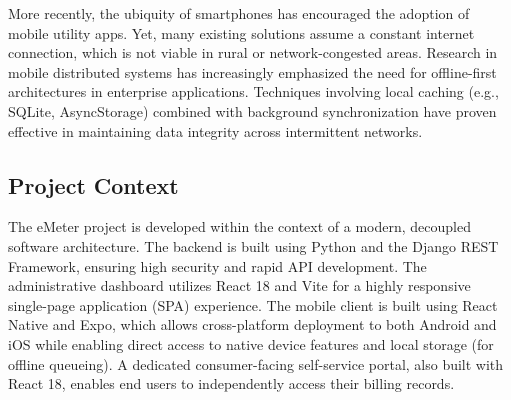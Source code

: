 \documentclass[12pt, a4paper, onecolumn]{report}
\begin{document}
More recently, the ubiquity of smartphones has encouraged the adoption of mobile utility apps. Yet, many existing solutions assume a constant internet connection, which is not viable in rural or network-congested areas. Research in mobile distributed systems has increasingly emphasized the need for offline-first architectures in enterprise applications. Techniques involving local caching (e.g., SQLite, AsyncStorage) combined with background synchronization have proven effective in maintaining data integrity across intermittent networks.

\subsection{Project Context}
The eMeter project is developed within the context of a modern, decoupled software architecture. The backend is built using Python and the Django REST Framework, ensuring high security and rapid API development. The administrative dashboard utilizes React 18 and Vite for a highly responsive single-page application (SPA) experience. The mobile client is built using React Native and Expo, which allows cross-platform deployment to both Android and iOS while enabling direct access to native device features and local storage (for offline queueing). A dedicated consumer-facing self-service portal, also built with React 18, enables end users to independently access their billing records.
\end{document}
